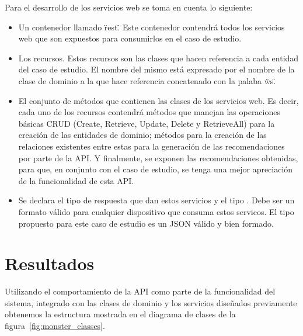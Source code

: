   Para el desarrollo de los servicios web se toma en cuenta lo siguiente:
  \begin{itemize}
    \item Un contenedor llamado \"rest\". Este contenedor contendrá todos los servicios web que son expuestos para consumirlos en el caso de estudio.
    \item Los recursos. Estos recursos son las clases que hacen referencia a cada entidad del caso de estudio. El nombre del mismo está expresado por el nombre de la clase de dominio a la que hace referencia concatenado con la palaba \"ws\".
    \item El conjunto de métodos que contienen las clases de los servicios web. Es decir, cada uno de los recursos contendrá métodos que manejan las operaciones básicas CRUD (Create, Retrieve, Update, Delete y RetrieveAll) para la creación de las entidades de dominio; métodos para la creación de las relaciones existentes entre estas para la generación de las recomendaciones por parte de la API. Y finalmente, se exponen las recomendaciones obtenidas, para que, en conjunto con el caso de estudio, se tenga una mejor apreciación de la funcionalidad de esta API.
    \item Se declara el tipo de respuesta que dan estos servicios y el tipo . Debe ser un formato válido para cualquier dispositivo que consuma estos servicos. El tipo propuesto para este caso de estudio es un JSON válido y bien formado.
  \end{itemize}

  \section{Resultados}
    Utilizando el comportamiento de la API como parte de la funcionalidad del sistema, integrado con las clases de dominio y los servicios diseñados previamente obtenemos la estructura mostrada en el diagrama de clases de la figura~\ref{fig:monster_classes}. 

